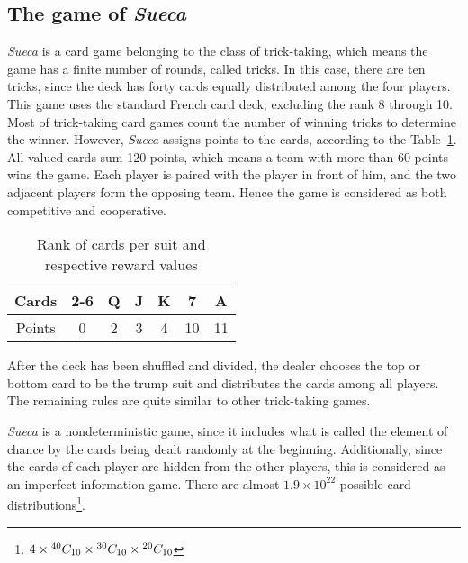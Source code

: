 \subsection{The game of \emph{Sueca}}

\emph{Sueca} is a card game belonging to the class of trick-taking, which means the game has a finite number of rounds, called tricks.
In this case, there are ten tricks, since the deck has forty cards equally distributed among the four players.
This game uses the standard French card deck, excluding the rank 8 through 10.
Most of trick-taking card games count the number of winning tricks to determine the winner.
However, \emph{Sueca} assigns points to the cards, according to the Table~\ref{tab:points-table}.
All valued cards sum 120 points, which means a team with more than 60 points wins the game.
Each player is paired with the player in front of him, and the two adjacent players form the opposing team.
Hence the game is considered as both competitive and cooperative.

\begin{table}[ht]
\centering
\begin{tabular}{|c|c|c|c|c|c|c|}
\hline
Cards  & 2-6 & Q & J & K & 7  & A  \\ \hline
Points & 0   & 2 & 3 & 4 & 10 & 11 \\ \hline
\end{tabular}
\caption{Rank of cards per suit and respective reward values}
\label{tab:points-table}
\end{table}

After the deck has been shuffled and divided, the dealer chooses the top or bottom card to be the trump suit and distributes the cards among all players.
The remaining rules are quite similar to other trick-taking games.


\emph{Sueca} is a nondeterministic game, since it includes what is called the element of chance by the cards being dealt randomly at the beginning.
Additionally, since the cards of each player are hidden from the other players, this is considered as an imperfect information game.
There are almost $1.9\times10^{22}$ possible card distributions\footnote{$4\times{}^{40}C_{10}\times{}^{30}C_{10}\times{}^{20}C_{10}$}.

